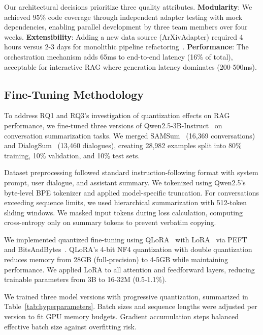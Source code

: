 \documentclass[pdflatex,sn-basic]{sn-jnl}
\begin{document}
Our architectural decisions prioritize three quality attributes. \textbf{Modularity}: We achieved 95\% code coverage through independent adapter testing with mock dependencies, enabling parallel development by three team members over four weeks. \textbf{Extensibility}: Adding a new data source (ArXivAdapter) required 4 hours versus 2-3 days for monolithic pipeline refactoring~\citep{langchain2023}. \textbf{Performance}: The orchestration mechanism adds 65ms to end-to-end latency (16\% of total), acceptable for interactive RAG where generation latency dominates (200-500ms).

\subsection{Fine-Tuning Methodology}
\label{sec:method-finetuning}

To address RQ1 and RQ3's investigation of quantization effects on RAG performance, we fine-tuned three versions of Qwen2.5-3B-Instruct~\citep{qwen2024technical} on conversation summarization tasks. We merged SAMSum~\citep{gliwa2019samsum} (16,369 conversations) and DialogSum~\citep{chen2021dialogsum} (13,460 dialogues), creating 28,982 examples split into 80\% training, 10\% validation, and 10\% test sets.

Dataset preprocessing followed standard instruction-following format with system prompt, user dialogue, and assistant summary. We tokenized using Qwen2.5's byte-level BPE tokenizer and applied model-specific truncation. For conversations exceeding sequence limits, we used hierarchical summarization with 512-token sliding windows. We masked input tokens during loss calculation, computing cross-entropy only on summary tokens to prevent verbatim copying.

We implemented quantized fine-tuning using QLoRA~\citep{dettmers2023qlora} with LoRA~\citep{hu2022lora} via PEFT~\citep{peft2023} and BitsAndBytes~\citep{dettmers2022bitfit}. QLoRA's 4-bit NF4 quantization with double quantization reduces memory from 28GB (full-precision) to 4-5GB while maintaining performance. We applied LoRA to all attention and feedforward layers, reducing trainable parameters from 3B to 16-32M (0.5-1.1\%).

We trained three model versions with progressive quantization, summarized in Table~\ref{tab:hyperparameters}. Batch sizes and sequence lengths were adjusted per version to fit GPU memory budgets. Gradient accumulation steps balanced effective batch size against overfitting risk.
\end{document}
